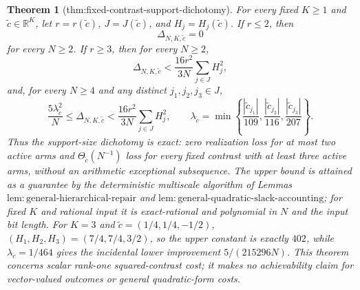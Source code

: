 \documentclass{article}
\newtheorem{theorem}{Theorem}
\begin{document}
\begin{theorem}[thm:fixed-contrast-support-dichotomy]\label{thm:fixed-contrast-support-dichotomy}
For every fixed \(K\ge1\) and \(\widetilde c\in\mathbb R^K\), let \(r=r(\widetilde c)\), \(J=J(\widetilde c)\), and \(H_j=H_j(\widetilde c)\).  If \(r\le2\), then
\[
 \Delta_{N,K,\widetilde c}=0
\]
for every \(N\ge2\).  If \(r\ge3\), then for every \(N\ge2\),
\[
 \Delta_{N,K,\widetilde c}
 <\frac{16r^2}{3N}\sum_{j\in J}H_j^2,
\]
and, for every \(N\ge4\) and any distinct \(j_1,j_2,j_3\in J\),
\[
 \frac{5\lambda_{\widetilde c}^2}{N}
 \le\Delta_{N,K,\widetilde c}
 <\frac{16r^2}{3N}\sum_{j\in J}H_j^2,
 \qquad
 \lambda_{\widetilde c}=\min\left\{
 \frac{|\widetilde c_{j_1}|}{109},
 \frac{|\widetilde c_{j_2}|}{116},
 \frac{|\widetilde c_{j_3}|}{207}\right\}.
\]
Thus the support-size dichotomy is exact: zero realization loss for at most two active arms and \(\Theta_{\widetilde c}(N^{-1})\) loss for every fixed contrast with at least three active arms, without an arithmetic exceptional subsequence.  The upper bound is attained as a guarantee by the deterministic multiscale algorithm of Lemmas \(\mathrm{lem{:}general\mbox{-}hierarchical\mbox{-}repair}\) and \(\mathrm{lem{:}general\mbox{-}quadratic\mbox{-}slack\mbox{-}accounting}\); for fixed \(K\) and rational input it is exact-rational and polynomial in \(N\) and the input bit length.  For \(K=3\) and \(\widetilde c=(1/4,1/4,-1/2)\), \((H_1,H_2,H_3)=(7/4,7/4,3/2)\), so the upper constant is exactly \(402\), while \(\lambda_{\widetilde c}=1/464\) gives the incidental lower improvement \(5/(215296N)\).  This theorem concerns scalar rank-one squared-contrast cost; it makes no achievability claim for vector-valued outcomes or general quadratic-form costs.
\end{theorem}
\end{document}
